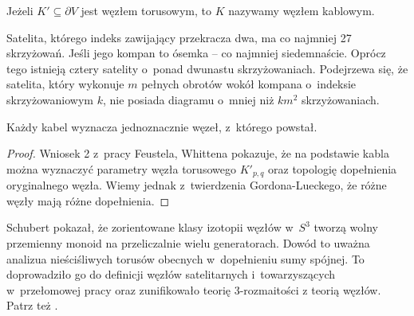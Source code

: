 \begin{definition}
    Jeżeli $K' \subseteq \partial V$ jest węzłem torusowym,    to $K$ nazywamy węzłem kablowym.
\end{definition}

Satelita, którego indeks zawijający przekracza dwa, ma co najmniej 27 skrzyżowań.
Jeśli jego kompan to ósemka -- co najmniej siedemnaście.
Oprócz tego istnieją cztery satelity o~ponad dwunastu skrzyżowaniach.
Podejrzewa się, że satelita, który wykonuje $m$ pełnych obrotów wokół kompana o~indeksie skrzyżowaniowym $k$, nie posiada diagramu o~mniej niż $km^2$ skrzyżowaniach.

\begin{proposition}
    Każdy kabel wyznacza jednoznacznie węzeł, z~którego powstał.
\end{proposition}

\begin{proof}
    Wniosek 2 z~pracy \cite{feustel78} Feustela, Whittena pokazuje, że na podstawie kabla można wyznaczyć parametry węzła torusowego $K'_{p,q}$ oraz topologię dopełnienia oryginalnego węzła.
    Wiemy jednak z~twierdzenia Gordona-Lueckego, że różne węzły mają różne dopełnienia.
\end{proof}

Schubert pokazał, że zorientowane klasy izotopii węzłów w~$S^3$ tworzą wolny przemienny monoid na przeliczalnie wielu generatorach.
Dowód to uważna analizua nieściśliwych torusów obecnych w~dopełnieniu sumy spójnej.
To doprowadziło go do definicji węzłów satelitarnych i~towarzyszących w~przełomowej pracy \cite{schubert53} oraz zunifikowało teorię 3-rozmaitości z teorią węzłów.
Patrz też \cite{motegi97}.

